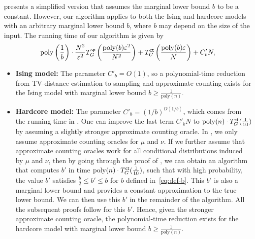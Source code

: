 \begin{remark}\label{remark:b}
 presents a simplified version that assumes the marginal lower bound \( b \) to be a constant. However, our algorithm applies to both the Ising and hardcore models with an arbitrary marginal lower bound \( b \), where \( b \) may depend on the size of the input. The running time of our algorithm is given by
\begin{align*}
    \mathrm{poly}\left(\frac{1}{b}\right) \cdot \frac{N^2}{\varepsilon^2} T^{\textsf{sp}}_G \left( \frac{\mathrm{poly}(b) \varepsilon^2}{N^2}\right) + T^{\textsf{ct}}_G\left(\frac{\mathrm{poly}(b) \varepsilon}{ N}\right) + C'_b N,
\end{align*}    
\begin{itemize}
    \item \textbf{Ising model:} The parameter \( C'_b = O(1) \), so a polynomial-time reduction from TV-distance estimation to sampling and approximate counting exists for the Ising model with marginal lower bound \( b \geq \frac{1}{\mathrm{poly}(n)} \).
    \item \textbf{Hardcore model:} The parameter  \( C'_b = (1/b)^{O(1/b)} \), which comes from the running time in . One can improve the last term \( C'_b N \) to \( \mathrm{poly}(n) \cdot T^{\textsf{ct}}_G(\frac{1}{10}) \) by assuming a slightly stronger approximate counting oracle. In , we only assume approximate counting oracles for \( \mu \) and \( \nu \). If we further assume that approximate counting oracles work for all conditional distributions induced by \( \mu \) and \( \nu \), then by going through the proof of , we can obtain an algorithm that computes \( b' \) in time \( \mathrm{poly}(n) \cdot T^{\textsf{ct}}_G(\frac{1}{10}) \), such that with high probability, the value \( b' \) satisfies \( \frac{b}{2} \leq b' \leq b \) for \( b \) defined in~\eqref{eq:def-b}. This \( b' \) is also a marginal lower bound and provides a constant approximation to the true lower bound. We can then use this \( b' \) in the remainder of the algorithm. All the subsequent proofs follow for this $b'$.  Hence, given the stronger approximate counting oracle, the polynomial-time reduction exists for the hardcore model with marginal lower bound $b \geq \frac{1}{\mathrm{poly}(n)}$. 
\end{itemize}
\end{remark}

